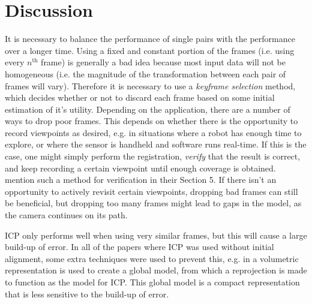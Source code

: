 \documentclass[a4paper]{article}
\begin{document}
\section{Discussion}
It is necessary to balance the performance of single pairs with the performance over a longer time. Using a fixed and constant portion of the frames (i.e. using every $n^{\mathrm{th}}$ frame) is generally a bad idea because most input data will not be homogeneous (i.e. the magnitude of the transformation between each pair of frames will vary). Therefore it is necessary to use a \emph{keyframe selection} method, which decides whether or not to discard each frame based on some initial estimation of it's utility. Depending on the application, there are a number of ways to drop poor frames. This depends on whether there is the opportunity to record viewpoints as desired, e.g. in situations where a robot has enough time to explore, or where the sensor is handheld and software runs real-time. If this is the case, one might simply perform the registration, \emph{verify} that the result is correct, and keep recording a certain viewpoint until enough coverage is obtained. \cite{makadia2006fully} mention such a method for verification in their Section 5. If there isn't an opportunity to actively revisit certain viewpoints, dropping bad frames can still be beneficial, but dropping too many frames might lead to gaps in the model, as the camera continues on its path.

\ac{ICP} only performs well when using very similar frames, but this will cause a large build-up of error. In all of the papers where \ac{ICP} was used without initial alignment, some extra techniques were used to prevent this, e.g. in \cite{izadi2011kinectfusion} a volumetric representation is used to create a global model, from which a reprojection is made to function as the model for \ac{ICP}. This global model is a compact representation that is less sensitive to the build-up of error.






{}

\end{document}
